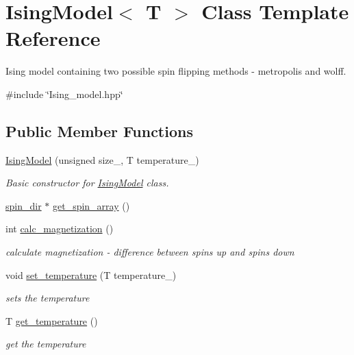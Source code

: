 \hypertarget{classIsingModel}{}\section{Ising\+Model$<$ T $>$ Class Template Reference}
\label{classIsingModel}


Ising model containing two possible spin flipping methods -\/ metropolis and wolff.  




{\ttfamily \#include \char`\"{}Ising\+\_\+model.\+hpp\char`\"{}}

\subsection*{Public Member Functions}
\begin{DoxyCompactItemize}
\item 
\mbox{\hyperlink{classIsingModel_a3c9a903d3ddada5ce514ba66f99b0282}{Ising\+Model}} (unsigned size\+\_, T temperature\+\_)
\begin{DoxyCompactList}\small\item\em Basic constructor for \mbox{\hyperlink{classIsingModel}{Ising\+Model}} class. \end{DoxyCompactList}\item 
\mbox{\hyperlink{classspin__dir}{spin\+\_\+dir}} $\ast$ \mbox{\hyperlink{classIsingModel_ad82f225e1b45f11ee5a99c3b12b25302}{get\+\_\+spin\+\_\+array}} ()
\item 
int \mbox{\hyperlink{classIsingModel_a349a13b847fb221eec7043fc53649640}{calc\+\_\+magnetization}} ()
\begin{DoxyCompactList}\small\item\em calculate magnetization -\/ difference between spins up and spins down \end{DoxyCompactList}\item 
void \mbox{\hyperlink{classIsingModel_abbd5b7935830eca268b7eacc94478649}{set\+\_\+temperature}} (T temperature\+\_\+)
\begin{DoxyCompactList}\small\item\em sets the temperature \end{DoxyCompactList}\item 
T \mbox{\hyperlink{classIsingModel_ad0252a860a935d1be2542f15b5c25936}{get\+\_\+temperature}} ()
\begin{DoxyCompactList}\small\item\em get the temperature \end{DoxyCompactList}\item 

\end{DoxyCompactItemize}
